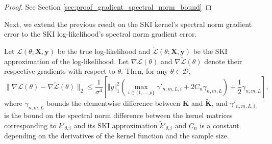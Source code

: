 \begin{proof}
See Section \ref{sec:proof_gradient_spectral_norm_bound}
\end{proof}

Next, we extend the previous result on the SKI kernel's spectral norm gradient error to the SKI log-likelihood's spectral norm gradient error.

\begin{lemma}\label{lemma:gradient-difference-bound-corrected}
Let $\mathcal{L}(\theta; \mathbf{X}, \mathbf{y})$ be the true log-likelihood and $\tilde{\mathcal{L}}(\theta; \mathbf{X}, \mathbf{y})$ be the SKI approximation of the log-likelihood. Let $\nabla \mathcal{L}(\theta)$ and $\nabla \tilde{\mathcal{L}}(\theta)$ denote their respective gradients with respect to $\theta$. Then, for any $\theta\in \mathcal{D}$,
$$
\| \nabla \mathcal{L}(\theta) - \nabla \tilde{\mathcal{L}}(\theta) \|_2 \leq \frac{1}{\sigma^4}\left[\Vert y\Vert_1^2\left(\max_{i \in \{1,\ldots,p\}} \gamma'_{n,m,L,i}+2 C_n\gamma_{n,m,L}\right)+\frac{1}{2}\gamma_{n,m,L}\right],
$$
where $\gamma_{n,m,L}$ bounds the elementwise difference between $\mathbf{K}$ and $\tilde{\mathbf{K}}$, and $\gamma'_{n,m,L,i}$ is the bound on the spectral norm difference between the kernel matrices corresponding to $k'_{\theta,i}$ and its SKI approximation $\tilde{k}'_{\theta,i}$ and $C_n$ is a constant depending on the derivatives of the kernel function and the sample size.
\end{lemma}

